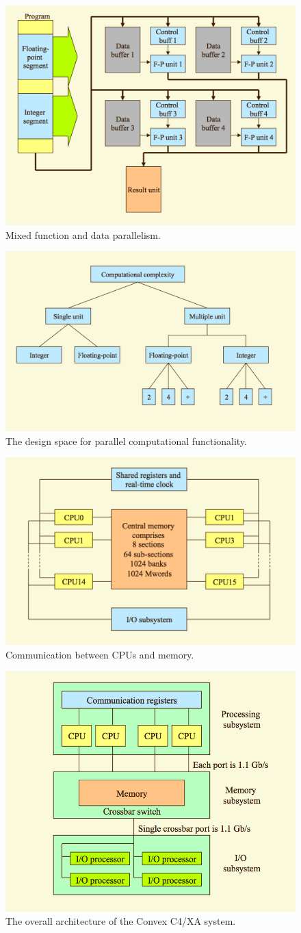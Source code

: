 \begin{figure}
\centering
\includegraphics[width=0.5\linewidth]{screenshot090}
\caption{Mixed function and data parallelism.}
\label{fig:screenshot090}
\end{figure}

\begin{figure}
\centering
\includegraphics[width=0.5\linewidth]{screenshot091}
\caption{The design space for parallel computational functionality.}
\label{fig:screenshot091}
\end{figure}

\begin{figure}
\centering
\includegraphics[width=0.5\linewidth]{screenshot092}
\caption{Communication between CPUs and memory.}
\label{fig:screenshot092}
\end{figure}

\begin{figure}
\centering
\includegraphics[width=0.5\linewidth]{screenshot093}
\caption{The overall architecture of the Convex C4/XA system.}
\label{fig:screenshot093}
\end{figure}

